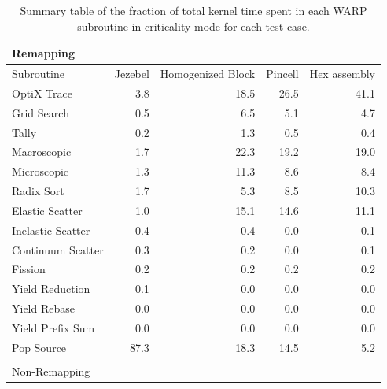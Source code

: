 \begin{table}[h!]
\centering
\caption{Summary table of the fraction of total kernel time spent in each WARP subroutine in criticality mode for each test case.}
\label{profile_summary}
\begin{tabular}{| l | r  | r | r | r |}
\multicolumn{5}{l}{Remapping} \\
 \hline
 Subroutine        & Jezebel & Homogenized Block & Pincell & Hex assembly  \\
 \hline \hline
 OptiX Trace       & 3.8       &    18.5                        &   26.5    &      41.1    \\ \hline
 Grid Search       & 0.5       &    6.5                         &   5.1       &      4.7       \\ \hline
 Tally                   & 0.2       &    1.3                         &   0.5       &      0.4       \\ \hline
 Macroscopic      & 1.7       &   22.3                        &   19.2      &     19.0     \\ \hline
 Microscopic       & 1.3       &    11.3                        &  8.6        &      8.4       \\ \hline
 Radix Sort         & 1.7       &     5.3                         &   8.5       &      10.3     \\ \hline
 Elastic Scatter   & 1.0       &     15.1                       &   14.6    &      11.1    \\ \hline
 Inelastic Scatter & 0.4       &     0.4                         &   0.0      &       0.1   \\ \hline
 Continuum Scatter & 0.3   &     0.2                         &   0.0      &       0.1   \\ \hline
 Fission               & 0.2       &      0.2                        &   0.2      &       0.2     \\ \hline
 Yield Reduction  & 0.1       &      0.0                        &   0.0     &       0.0    \\ \hline
 Yield Rebase     & 0.0        &     0.0                         &   0.0     &       0.0   \\ \hline
 Yield Prefix Sum &  0.0       &    0.0                         &   0.0     &       0.0   \\ \hline
 Pop Source         &  87.3     &    18.3                       &   14.5   &      5.2    \\ 
\hline
\multicolumn{5}{l}{} \\
\multicolumn{5}{l}{Non-Remapping} \\

\end{tabular}
\end{table}
